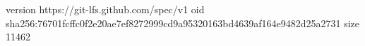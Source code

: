 version https://git-lfs.github.com/spec/v1
oid sha256:76701fcffc0f2e20ae7ef8272999cd9a95320163bd4639af164e9482d25a2731
size 11462
